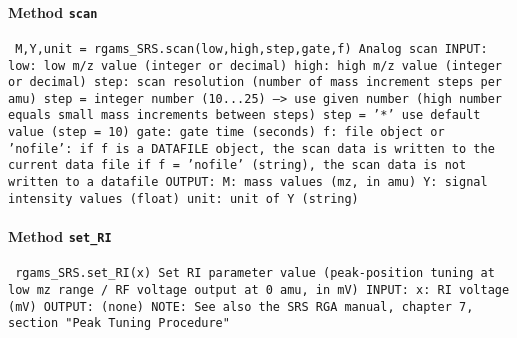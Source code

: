 \paragraph{Method \texttt{scan}}
\vspace{1ex}
\texttt{\newline
M,Y,unit = rgams_SRS.scan(low,high,step,gate,f)\newline
\newline
Analog scan\newline
\newline
INPUT:\newline
low: low m/z value (integer or decimal)\newline
high: high m/z value (integer or decimal)\newline
step: scan resolution (number of mass increment steps per amu)\newline
step = integer number (10...25) --> use given number (high number equals small mass increments between steps)\newline
step = '*' use default value (step = 10)\newline
gate: gate time (seconds)\newline
f: file object or 'nofile':\newline
if f is a DATAFILE object, the scan data is written to the current data file\newline
if f = 'nofile' (string), the scan data is not written to a datafile\newline
\newline
OUTPUT:\newline
M: mass values (mz, in amu)\newline
Y: signal intensity values (float)\newline
unit: unit of Y (string)\newline
\newline
}

\paragraph{Method \texttt{set_RI}}
\vspace{1ex}
\texttt{\newline
rgams_SRS.set_RI(x)\newline
\newline
Set RI parameter value (peak-position tuning at low mz range / RF voltage output at 0 amu, in mV)\newline
\newline
INPUT:\newline
x: RI voltage (mV)\newline
\newline
OUTPUT:\newline
(none)\newline
\newline
NOTE:\newline
See also the SRS RGA manual, chapter 7, section "Peak Tuning Procedure"\newline
\newline
}

